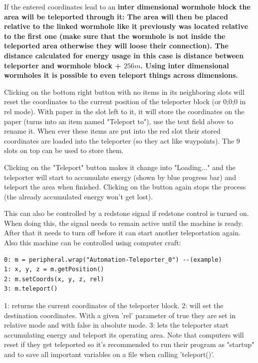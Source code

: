 \documentclass[11pt]{article} %
\begin{document}
If the entered coordinates lead to an \bf inter dimensional wormhole \rm block the area will be teleported through it: The area will then be placed relative to the linked wormhole like it previously was located relative to the first one (make sure that the wormhole is not inside the teleported area otherwise they will loose their connection). The distance calculated for energy usage in this case is distance between teleporter and wormhole block + $256m$. Using inter dimensional wormholes it is possible to even teleport things across dimensions.

Clicking on the bottom right button with no items in its neighboring slots will reset the coordinates to the current position of the teleporter block (or 0;0;0 in rel mode). With paper in the slot left to it, it will store the coordinates on the paper (turns into an item named "Teleport to"), use the text field above to rename it. When ever these items are put into the red slot their stored coordinates are loaded into the teleporter (so they act like waypoints). The 9 slots on top can be used to store them.

Clicking on the "Teleport" button makes it change into "Loading..." and the teleporter will start to accumulate energy (shown by blue progress bar) and teleport the area when finished. Clicking on the button again stops the process (the already accumulated energy won't get lost). 

This can also be controlled by a redstone signal if redstone control is turned on. When doing this, the signal needs to remain active until the machine is ready. After that it needs to turn off before it can start another teleportation again.\\

Also this machine can be controlled using computer craft:
\begin{lstlisting}
0: m = peripheral.wrap("Automation-Teleporter_0") --(example)
1: x, y, z = m.getPosition()
2: m.setCoords(x, y, z, rel)
3: m.teleport()
\end{lstlisting}
1: returns the current coordinates of the teleporter block. 2: will set the destination coordinates. With a given 'rel' parameter of true they are set in relative mode and with false in absolute mode. 3: lets the teleporter start accumulating energy and teleport its operating area. Note that computers will reset if they get teleported so it's recommended to run their program as "startup" and to save all important variables on a file when calling 'teleport()'. \\
\end{document}
